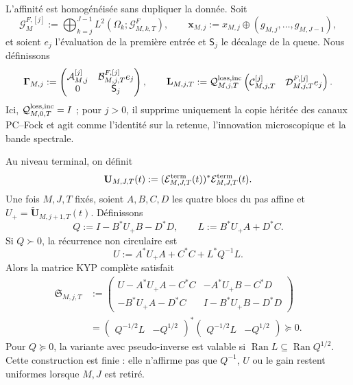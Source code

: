 L'affinité est homogénéisée sans dupliquer la donnée. Soit
\[
 \mathscr G_M^{F,[j]}
 :=\bigoplus_{k=j}^{J-1}L^2(\Omega_k;\mathscr G^F_{M,k,T}),
 \qquad
 \mathbf x_{M,j}:=x_{M,j}\oplus(g_{M,j},\ldots,g_{M,J-1}),
\]
et soient \(e_j\) l'évaluation de la première entrée et \(\mathsf S_j\) le décalage de la queue. Nous définissons
\begin{equation}
 \mathbf\Gamma_{M,j}
 :=\begin{pmatrix}
  \mathcal A_{M,j}^{[j]}&\mathcal B_{M,j,T}^{F,[j]}e_j\\
  0&\mathsf S_j
 \end{pmatrix},
 \qquad
 \mathbf L_{M,j,T}
 :=\mathcal Q_{M,j,T}^{\rm loss,inc}
 \begin{pmatrix}
  \mathcal C_{M,j,T}^{[j]}&\mathcal D_{M,j,T}^{F,[j]}e_j
 \end{pmatrix}.
 \label{eq:ns-import-homogeneous-affine-step}
\end{equation}
Ici, \(\mathcal Q_{M,0,T}^{\rm loss,inc}=I\) ; pour \(j>0\), il supprime uniquement la copie héritée des canaux PC--Fock et agit comme l'identité sur la retenue, l'innovation microscopique et la bande spectrale.

\begin{theorem}
\label{thm:ns-import-affine-stein}
Au niveau terminal, on définit
\begin{equation}
 \mathbf U_{M,J,T}(t)
 :=(\mathcal E_{M,J,T}^{\rm term}(t))^*
   \mathcal E_{M,J,T}^{\rm term}(t).
 \label{eq:ns-import-terminal-metric}
\end{equation}
Une fois \(M,J,T\) fixés, soient \(A,B,C,D\) les quatre blocs du pas affine et \(U_+=\widetilde{\mathbf U}_{M,j+1,T}(t)\). Définissons
\begin{equation}
 Q:=I-B^*U_+B-D^*D,
 \qquad L:=B^*U_+A+D^*C.
 \label{eq:ns-import-kyp-q-l}
\end{equation}
Si \(Q\succ0\), la récurrence non circulaire est
\begin{equation}
 U:=A^*U_+A+C^*C+L^*Q^{-1}L.
 \label{eq:ns-import-affine-stein}
\end{equation}
Alors la matrice KYP complète satisfait
\begin{equation}
 \begin{aligned}
 \mathfrak S_{M,j,T}
 &:=
 \begin{pmatrix}
 U-A^*U_+A-C^*C&-A^*U_+B-C^*D\\
 -B^*U_+A-D^*C&I-B^*U_+B-D^*D
 \end{pmatrix}\\
 &=
 \begin{pmatrix}Q^{-1/2}L&-Q^{1/2}\end{pmatrix}^{*}
 \begin{pmatrix}Q^{-1/2}L&-Q^{1/2}\end{pmatrix}
 \succeq0.
 \end{aligned}
 \label{eq:ns-import-affine-supply}
\end{equation}
Pour \(Q\succeq0\), la variante avec pseudo-inverse est valable si \(\operatorname{Ran}L\subseteq\operatorname{Ran}Q^{1/2}\). Cette construction est finie : elle n'affirme pas que \(Q^{-1}\), \(U\) ou le gain restent uniformes lorsque \(M,J\) est retiré.
\end{theorem}

